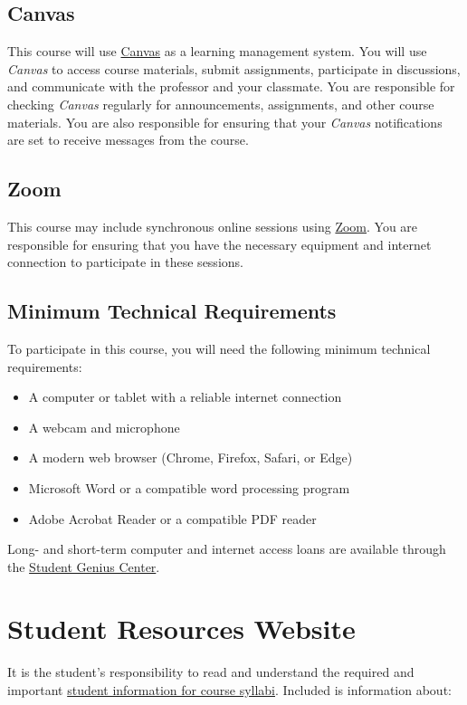 \documentclass[11pt]{article}     %
\begin{document}
\subsection*{Canvas}

This course will use \href{https://csufullerton.instructure.com/}{Canvas} as a learning management system. You will use \emph{Canvas} to access course materials, submit assignments, participate in discussions, and communicate with the professor and your classmate. You are responsible for checking \emph{Canvas} regularly for announcements, assignments, and other course materials. You are also responsible for ensuring that your \emph{Canvas} notifications are set to receive messages from the course.

\subsection*{Zoom}
This course may include synchronous online sessions using \href{https://fullerton.zoom.us/}{Zoom}. You are responsible for ensuring that you have the necessary equipment and internet connection to participate in these sessions.

\subsection*{Minimum Technical Requirements}

To participate in this course, you will need the following minimum technical requirements:
\begin{itemize}
    \item A computer or tablet with a reliable internet connection
    \item A webcam and microphone
    \item A modern web browser (Chrome, Firefox, Safari, or Edge)
    \item Microsoft Word or a compatible word processing program
    \item Adobe Acrobat Reader or a compatible PDF reader
\end{itemize}

\noindent Long- and short-term computer and internet access loans are available through the \href{http://www.fullerton.edu/it/students/sgc/index.php}{Student Genius Center}.

\section*{Student Resources Website}
It is the student's responsibility to read and understand the required and important \href{https://fdc.fullerton.edu/teaching/student-info-syllabi.html}{student information for course syllabi}. Included is information about:
\end{document}
